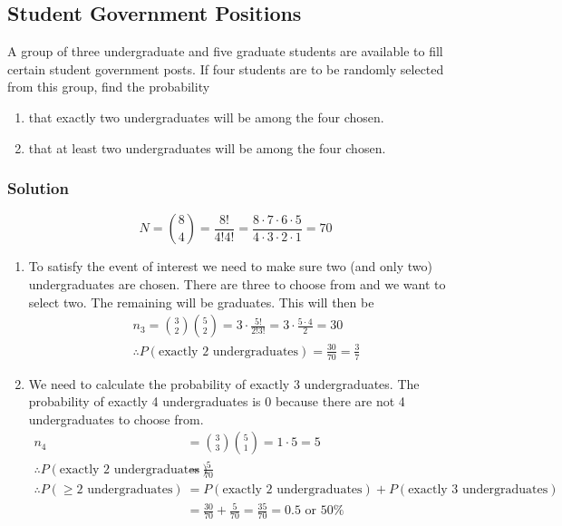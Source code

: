 \documentclass[11pt]{article}
\theoremstyle{definition}
\begin{document}
\subsection{Student Government Positions}

A group of three undergraduate and five graduate students are available to fill certain student government posts. If four students are to be randomly selected from this group, find the probability

\begin{enumerate}
	\item that exactly two undergraduates will be among the four chosen.
	\item that at least two undergraduates will be among the four chosen.
\end{enumerate}

\subsubsection*{Solution}

$$
	N = {8 \choose 4} = \frac{8!}{4!4!} = \frac{8\cdot7\cdot6\cdot5}{4\cdot3\cdot2\cdot1} = 70
$$

\begin{enumerate}
	\item To satisfy the event of interest we need to make sure two (and only two) undergraduates are chosen. There are three to choose from and we want to select two. The remaining will be graduates. This will then be
	$$
		\begin{aligned}
			n_3 = {3 \choose 2}{5 \choose 2} = 3 \cdot \frac{5!}{2!3!} = 3 \cdot \frac{5 \cdot 4}{2} = 30 \\
			\therefore P(\text{exactly 2 undergraduates}) = \frac{30}{70} = \frac{3}{7}
		\end{aligned}
	$$
	\item We need to calculate the probability of exactly 3 undergraduates. The probability of exactly 4 undergraduates is 0 because there are not 4 undergraduates to choose from.
	$$
		\begin{aligned}
			n_4 & = {3 \choose 3}{5 \choose 1} = 1 \cdot 5 = 5 \\
			\therefore P(\text{exactly 2 undergraduates}) & = \frac{5}{70} \\
			\therefore P(\geq \text{2 undergraduates}) & = P(\text{exactly 2 undergraduates}) + P(\text{exactly 3 undergraduates}) \\
			& = \frac{30}{70} + \frac{5}{70} = \frac{35}{70} = \text{0.5 or 50\%}
		\end{aligned}
	$$
\end{enumerate}
\end{document}
